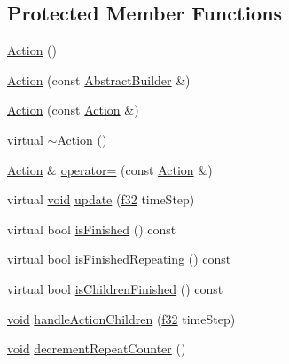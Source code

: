 \subsection*{Protected Member Functions}
\begin{DoxyCompactItemize}
\item 
\mbox{\hyperlink{classnjli_1_1_action_a8eea8ac4abc1e39cf11326854633736b}{Action}} ()
\item 
\mbox{\hyperlink{classnjli_1_1_action_a06624fdbd7e7d8d6b814b17106520c3c}{Action}} (const \mbox{\hyperlink{classnjli_1_1_abstract_builder}{Abstract\+Builder}} \&)
\item 
\mbox{\hyperlink{classnjli_1_1_action_afc2efdef9092be597613173a32ffd6f9}{Action}} (const \mbox{\hyperlink{classnjli_1_1_action}{Action}} \&)
\item 
virtual \mbox{\hyperlink{classnjli_1_1_action_ae04ff281cd7a1305d6045cdd2927d338}{$\sim$\+Action}} ()
\item 
\mbox{\hyperlink{classnjli_1_1_action}{Action}} \& \mbox{\hyperlink{classnjli_1_1_action_a37b0d25b50c21f8eaedeb357ddd9227d}{operator=}} (const \mbox{\hyperlink{classnjli_1_1_action}{Action}} \&)
\item 
virtual \mbox{\hyperlink{_thread_8h_af1e856da2e658414cb2456cb6f7ebc66}{void}} \mbox{\hyperlink{classnjli_1_1_action_aa1e2033b0f03fa1dce4c39fa707b84fe}{update}} (\mbox{\hyperlink{_util_8h_a5f6906312a689f27d70e9d086649d3fd}{f32}} time\+Step)
\item 
virtual bool \mbox{\hyperlink{classnjli_1_1_action_a43b0e8f7215465c8feeb575df61553a7}{is\+Finished}} () const
\item 
virtual bool \mbox{\hyperlink{classnjli_1_1_action_aee872536b8ca9280f18297981b7c503d}{is\+Finished\+Repeating}} () const
\item 
virtual bool \mbox{\hyperlink{classnjli_1_1_action_ac60289bdccce76f0ca044b2bde60f9e6}{is\+Children\+Finished}} () const
\item 
\mbox{\hyperlink{_thread_8h_af1e856da2e658414cb2456cb6f7ebc66}{void}} \mbox{\hyperlink{classnjli_1_1_action_ab787c5769b5be7861a921ee20aa6c9b7}{handle\+Action\+Children}} (\mbox{\hyperlink{_util_8h_a5f6906312a689f27d70e9d086649d3fd}{f32}} time\+Step)
\item 
\mbox{\hyperlink{_thread_8h_af1e856da2e658414cb2456cb6f7ebc66}{void}} \mbox{\hyperlink{classnjli_1_1_action_a39b7125ce9d6462992899cd9b1d16182}{decrement\+Repeat\+Counter}} ()
\end{DoxyCompactItemize}
